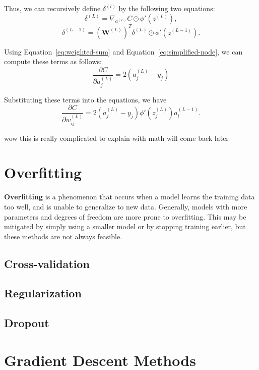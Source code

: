 \documentclass[12pt]{report}
\theoremstyle{definition}
\theoremstyle{remark}
\begin{document}
Thus, we can recursively define $\delta^{(l)}$ by the following two equations:
\begin{equation}
    \delta^{(L)} = \nabla_{a^{(L)}}C \odot \phi'(z^{(L)}),
\end{equation}
\begin{equation}
    \delta^{(L-1)} = {\left(\mathbf{W}^{(L)}\right)}^T \delta^{(L)} \odot \phi'(z^{(L-1)}).
\end{equation}

Using Equation~\ref{eq:weighted-sum} and Equation~\ref{eq:simplified-node}, we can compute these terms as follows:
\begin{equation}
    \frac{\partial C}{\partial a_j^{(L)}} = 2(a_j^{(L)} - y_j)
\end{equation}

Substituting these terms into the equations, we have
\begin{equation}
    \frac{\partial C}{\partial w_{ij}^{(L)}} = 2(a_j^{(L)} - y_j) \phi'(z_j^{(L)}) a_i^{(L-1)}.
\end{equation}

wow this is really complicated to explain with math will come back later

\section{Overfitting}\label{sec:overfitting}
\textbf{Overfitting} is a phenomenon that occurs when a model learns the training data too well, and is unable to generalize to new data. Generally, models with more parameters and degrees of freedom are more prone to overfitting. This may be mitigated by simply using a smaller model or by stopping training earlier, but these methods are not always feasible.

\subsection{Cross-validation}

\subsection{Regularization}

\subsection{Dropout}

\section{Gradient Descent Methods}\label{sec:gradient-descent-methods}
\end{document}
